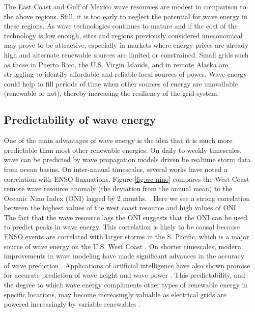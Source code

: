 The East Coast and Gulf of Mexico wave resources are modest in comparison to the above regions. Still, it is too early to neglect the potential for wave energy in these regions. As wave technologies continues to mature and if the cost of the technology is low enough, sites and regions previously considered uneconomical may prove to be attractive, especially in markets where energy prices are already high and alternate renewable sources are limited or constrained. Small grids such as those in Puerto Rico, the U.S. Virgin Islands, and in remote Alaska are struggling to identify affordable and reliable local sources of power. Wave energy could help to fill periods of time when other sources of energy are unavailable (renewable or not), thereby increasing the resiliency of the grid-system.

\subsection{Predictability of wave energy}
One of the main advantages of wave energy is the idea that it is much more predictable than most other renewable energies. On daily to weekly timescales, wave can be predicted by wave propagation models driven be realtime storm data from ocean basins. On inter-annual timescales, several works have noted a correlation with ENSO fluxuations. Figure \ref{fig:wc-nino} compares the West Coast remote wave resource anomaly (the deviation from the annual mean) to the Oceanic Nino Index (ONI) lagged by 2 months. \cite{nationaloceanicandatmosphericadministrationOceanicNinoIndex2020}.
Here we see a strong correlation between the highest values of the west coast resource and high values of ONI. The fact that the wave resource lags the ONI suggests that the ONI can be used to predict peaks in wave energy. This correlation is likely to be causal because ENSO events are correlated with larger storms in the S. Pacific, which is a major source of wave energy on the U.S. West Coast \citep{andersonClimateIndexOptimized2018, yangCharacteristicsVariabilityNearshore2020, ruggieroNationalAssessmentShoreline2013}.
On shorter timescales, modern improvements in wave modeling have made significant advances in the accuracy of wave prediction \citep{cavaleriWaveModellingCoastal2018}. Applications of artificial intelligence have also shown promise for accurate prediction of wave height and wave power \citep[e.g.][]{cornejo-bueno_significant_2016}. This predictability, and the degree to which wave energy compliments other types of renewable energy in specific locations, may become increasingly valuable as electrical grids are powered increasingly by variable renewables \cite{parkinsonIntegratingOceanWave2015}.


